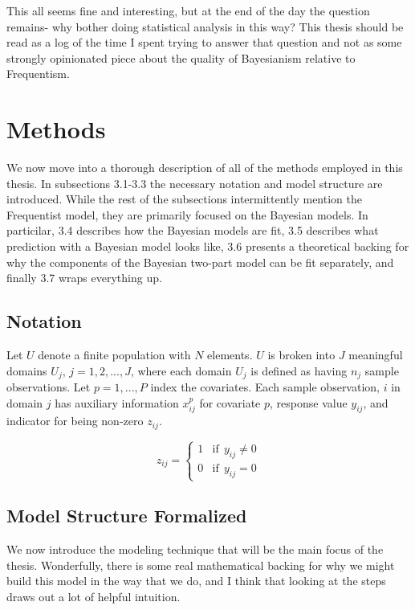 \documentclass[12pt,twoside]{reedthesis}
\begin{document}
This all seems fine and interesting, but at the end of the day the question remains- why bother doing statistical analysis in this way? This thesis should be read as a log of the time I spent trying to answer that question and not as some strongly opinionated piece about the quality of Bayesianism relative to Frequentism.

\hypertarget{methods-sec}{%
\chapter{Methods}\label{methods-sec}}

We now move into a thorough description of all of the methods employed in this thesis. In subsections 3.1-3.3 the necessary notation and model structure are introduced. While the rest of the subsections intermittently mention the Frequentist model, they are primarily focused on the Bayesian models. In particilar, 3.4 describes how the Bayesian models are fit, 3.5 describes what prediction with a Bayesian model looks like, 3.6 presents a theoretical backing for why the components of the Bayesian two-part model can be fit separately, and finally 3.7 wraps everything up.

\hypertarget{notation}{%
\section{Notation}\label{notation}}

Let \(U\) denote a finite population with \(N\) elements. \(U\) is broken into \(J\) meaningful domains \(U_j\), \(j = 1, 2, ..., J\), where each domain \(U_j\) is defined as having \(n_j\) sample observations. Let \(p = 1, ..., P\) index the covariates. Each sample observation, \(i\) in domain \(j\) has auxiliary information \(x_{ij}^p\) for covariate \(p\), response value \(y_{ij}\), and indicator for being non-zero \(z_{ij}\).

\[
z_{ij} =
\begin{cases}
1 & \text{if}\ \ y_{ij} \ne 0 \\
0 & \text{if} \ \ y_{ij} = 0
\end{cases}
\]

\hypertarget{model-structure-formalized}{%
\section{Model Structure Formalized}\label{model-structure-formalized}}

We now introduce the modeling technique that will be the main focus of the thesis. Wonderfully, there is some real mathematical backing for why we might build this model in the way that we do, and I think that looking at the steps draws out a lot of helpful intuition.
\end{document}

